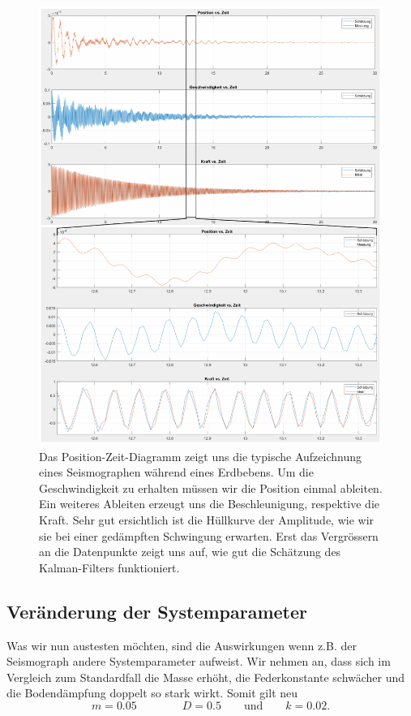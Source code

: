 \begin{figure}
	\begin{center}
		\includegraphics[width=\linewidth,keepaspectratio]{papers/erdbeben/images/standard.PDF}
		\caption{Das Position-Zeit-Diagramm zeigt uns die typische Aufzeichnung eines Seismographen während eines Erdbebens. Um die Geschwindigkeit zu erhalten müssen wir die Position einmal ableiten. Ein weiteres Ableiten erzeugt uns die Beschleunigung, respektive die Kraft. Sehr gut ersichtlich ist die Hüllkurve der Amplitude, wie wir sie bei einer gedämpften Schwingung erwarten. Erst das Vergrössern an die Datenpunkte zeigt uns auf, wie gut die Schätzung des Kalman-Filters funktioniert.}
    \label{erdbeben:fig:standard-alles}
	\end{center}
\end{figure}

\subsection{Veränderung der Systemparameter}
Was wir nun austesten möchten, sind die Auswirkungen wenn z.B. der Seismograph andere Systemparameter aufweist.
Wir nehmen an, dass sich im Vergleich zum Standardfall die Masse erhöht, die Federkonstante schwächer und die Bodendämpfung doppelt so stark wirkt.
Somit gilt neu
\[
m = 0.05
\qquad \qquad
D = 0.5
\qquad \text{und} \qquad
k = 0.02.
\]

